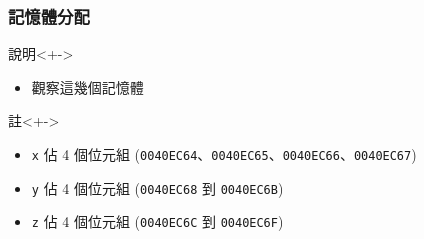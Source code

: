 \documentclass[utf8]{beamer}
\begin{document}
\begin{CJK}{UTF8}{bkai}
\begin{frame}
  \frametitle{記憶體分配}
  \begin{block}{說明}<+->
    \begin{itemize}
    \item 觀察這幾個記憶體
    \end{itemize}
  \end{block}
  \begin{exampleblock}{註}<+->
    \begin{itemize}
    \item \texttt{x} 佔 4 個位元組 (\texttt{0040EC64}、\texttt{0040EC65}、\texttt{0040EC66}、\texttt{0040EC67})
    \item<+-> \texttt{y} 佔 4 個位元組 (\texttt{0040EC68} 到 \texttt{0040EC6B})
    \item<+-> \texttt{z} 佔 4 個位元組 (\texttt{0040EC6C} 到 \texttt{0040EC6F})
    \end{itemize}
  \end{exampleblock}
\end{frame}


\end{CJK}
\end{document}
